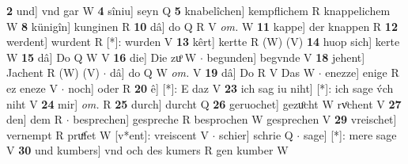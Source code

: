 \documentclass[8pt,a4paper,notitlepage]{article}
\begin{document}
\begin{table}[ht]
\begin{minipage}[t]{0.5\linewidth}
\textbf{2} und] vnd gar W \textbf{4} sîniu] seyn Q \textbf{5} knabelîchen] kempflichem R knappelichem W \textbf{8} künigîn] kunginen R \textbf{10} dâ] do Q R V \textit{om.} W \textbf{11} kappe] der knappen R \textbf{12} werdent] wurdent R [*]: wurden V \textbf{13} kêrt] kertte R (W) (V) \textbf{14} huop sich] kerte W \textbf{15} dâ] Do Q W V \textbf{16} die] Die zuͦ W  $\cdot$ begunden] begvnde V \textbf{18} jehent] Jachent R (W) (V)  $\cdot$ dâ] do Q W \textit{om.} V \textbf{19} dâ] Do R V Das W  $\cdot$ enezze] enige R ez eneze V  $\cdot$ noch] oder R \textbf{20} ê] [*]: E daz V \textbf{23} ich sag iu niht] [*]: ich sage v́ch niht V \textbf{24} mir] \textit{om.} R \textbf{25} durch] durcht Q \textbf{26} geruochet] gezuͦcht W rvͦchent V \textbf{27} den] dem R  $\cdot$ besprechen] gespreche R besprochen W gesprechen V \textbf{29} vreischet] vernempt R pruͤfet W [v*ent]: vreiscent V  $\cdot$ schier] schrie Q  $\cdot$ sage] [*]: mere sage V \textbf{30} und kumbers] vnd och des kumers R gen kumber W \newline
\end{minipage}
\end{table}
\end{document}
